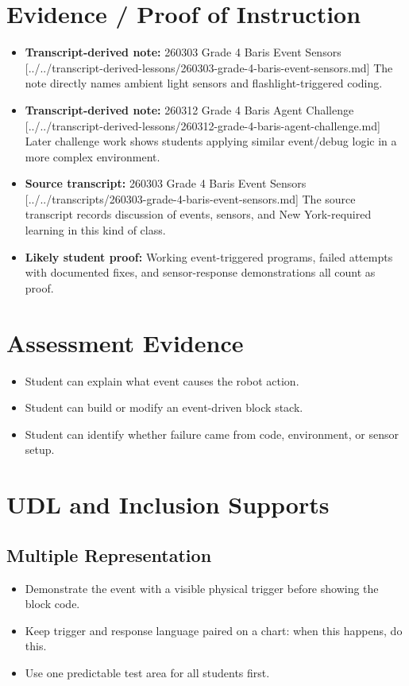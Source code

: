 \documentclass[11pt]{article}
\begin{document}
\section*{Evidence / Proof of Instruction}
\begin{itemize}[leftmargin=*]
\item \textbf{Transcript-derived note:} 260303 Grade 4 Baris Event Sensors [../../transcript-derived-lessons/260303-grade-4-baris-event-sensors.md] The note directly names ambient light sensors and flashlight-triggered coding.
\item \textbf{Transcript-derived note:} 260312 Grade 4 Baris Agent Challenge [../../transcript-derived-lessons/260312-grade-4-baris-agent-challenge.md] Later challenge work shows students applying similar event/debug logic in a more complex environment.
\item \textbf{Source transcript:} 260303 Grade 4 Baris Event Sensors [../../transcripts/260303-grade-4-baris-event-sensors.md] The source transcript records discussion of events, sensors, and New York-required learning in this kind of class.
\item \textbf{Likely student proof:} Working event-triggered programs, failed attempts with documented fixes, and sensor-response demonstrations all count as proof.
\end{itemize}

\section*{Assessment Evidence}
\begin{itemize}[leftmargin=*]
\item Student can explain what event causes the robot action.
\item Student can build or modify an event-driven block stack.
\item Student can identify whether failure came from code, environment, or sensor setup.
\end{itemize}

\section*{UDL and Inclusion Supports}
\subsection*{Multiple Representation}
\begin{itemize}[leftmargin=*]
\item Demonstrate the event with a visible physical trigger before showing the block code.
\item Keep trigger and response language paired on a chart: when this happens, do this.
\item Use one predictable test area for all students first.
\end{itemize}
\end{document}
